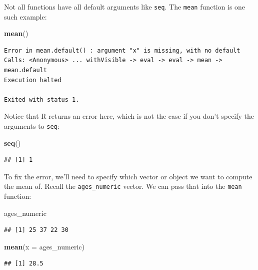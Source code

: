 \documentclass[]{tufte-book}
\newenvironment{Shaded}{\begin{snugshade}}{\end{snugshade}}
\newcommand{\AttributeTok}[1]{\textcolor[rgb]{0.13,0.29,0.53}{#1}}
\newcommand{\FunctionTok}[1]{\textcolor[rgb]{0.13,0.29,0.53}{\textbf{#1}}}
\newcommand{\NormalTok}[1]{#1}
\begin{document}
Not all functions have all default arguments like \texttt{seq}. The \texttt{mean} function is one such example:

\begin{Shaded}
\begin{Highlighting}[]
\FunctionTok{mean}\NormalTok{()}
\end{Highlighting}
\end{Shaded}

\begin{verbatim}
Error in mean.default() : argument "x" is missing, with no default
Calls: <Anonymous> ... withVisible -> eval -> eval -> mean -> mean.default
Execution halted

Exited with status 1.
\end{verbatim}

Notice that R returns an error here, which is not the case if you don't specify the arguments to \texttt{seq}:

\begin{Shaded}
\begin{Highlighting}[]
\FunctionTok{seq}\NormalTok{()}
\end{Highlighting}
\end{Shaded}

\begin{verbatim}
## [1] 1
\end{verbatim}

To fix the error, we'll need to specify which vector or object we want to compute the mean of. Recall the \texttt{ages\_numeric} vector. We can pass that into the \texttt{mean} function:

\begin{Shaded}
\begin{Highlighting}[]
\NormalTok{ages\_numeric}
\end{Highlighting}
\end{Shaded}

\begin{verbatim}
## [1] 25 37 22 30
\end{verbatim}

\begin{Shaded}
\begin{Highlighting}[]
\FunctionTok{mean}\NormalTok{(}\AttributeTok{x =}\NormalTok{ ages\_numeric)}
\end{Highlighting}
\end{Shaded}

\begin{verbatim}
## [1] 28.5
\end{verbatim}
\end{document}
